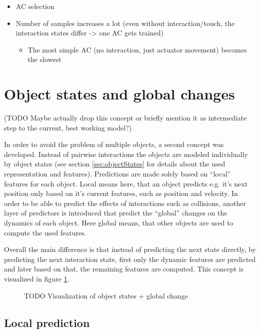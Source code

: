 \begin{itemize}
\item AC selection
\item Number of samples increases a lot (even without interaction/touch, the interaction states 
differ -> one AC gets trained)
\begin{itemize}
\item The most simple AC (no interaction, just actuator movement) becomes the slowest
\end{itemize}
\end{itemize}


\section{Object states and global changes\label{sec:objectChange}}
(TODO
Maybe actually drop this concept or briefly mention it as intermediate step to the current, best 
working model?)


In order to avoid the problem of multiple objects, a second concept was 
developed. Instead of pairwise interactions the objects are modeled 
individually by object states (see section \ref{sec:objectStates} for details about the used representation and features). 
Predictions are made solely based on \enquote{local} features for each object. 
Local means here, that an object predicts e.g. it's next position only based on it's
current features, such as position and velocity. 
In order to be able to predict the effects of interactions such as collisions, 
another layer of predictors is introduced that predict the \enquote{global} 
changes on the dynamics of each object. Here global means, that other objects 
are used to compute the used features.

Overall the main difference is that instead of predicting the next state 
directly, by predicting the next interaction state, first only the dynamic 
features are predicted and later based on that, the remaining features are 
computed. This concept is visualized in figure \ref{fig:osChangeIdea}.

\begin{figure}
\caption{TODO Visualization of object states + global change}
\label{fig:osChangeIdea}
\end{figure}


\subsection{Local prediction}


